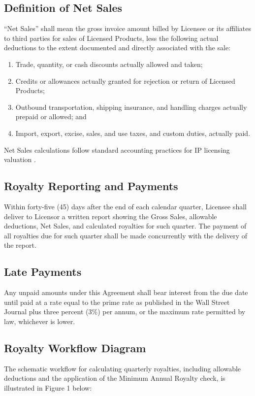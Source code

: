 \subsection{Definition of Net Sales} ``Net Sales'' shall mean the gross invoice amount billed by Licensee or its affiliates to third parties for sales of Licensed Products, less the following actual deductions to the extent documented and directly associated with the sale:
\begin{enumerate}
  \item Trade, quantity, or cash discounts actually allowed and taken;
  \item Credits or allowances actually granted for rejection or return of Licensed Products;
  \item Outbound transportation, shipping insurance, and handling charges actually prepaid or allowed; and
  \item Import, export, excise, sales, and use taxes, and custom duties, actually paid.
\end{enumerate}
Net Sales calculations follow standard accounting practices for IP licensing valuation \cite{smith2023valuation}.

\subsection{Royalty Reporting and Payments} Within forty-five (45) days after the end of each calendar quarter, Licensee shall deliver to Licensor a written report showing the Gross Sales, allowable deductions, Net Sales, and calculated royalties for such quarter. The payment of all royalties due for such quarter shall be made concurrently with the delivery of the report.

\subsection{Late Payments} Any unpaid amounts under this Agreement shall bear interest from the due date until paid at a rate equal to the prime rate as published in the Wall Street Journal plus three percent (3\%) per annum, or the maximum rate permitted by law, whichever is lower.

\subsection{Royalty Workflow Diagram}
The schematic workflow for calculating quarterly royalties, including allowable deductions and the application of the Minimum Annual Royalty check, is illustrated in Figure 1 below:


